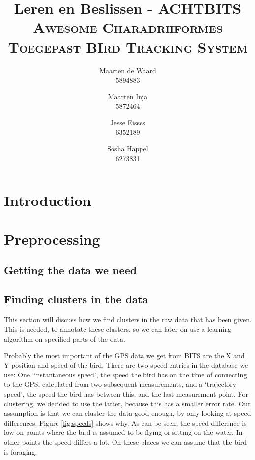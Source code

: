 \documentclass[a4paper,10pt]{article}
\title{Leren en Beslissen - ACHTBITS\\\large \textsc{Awesome Charadriiformes Toegepast
BIrd Tracking System}}
\author{Maarten de Waard\\5894883 \and Maarten Inja \\5872464 \and Jesse Eisses \\
6352189 \and Sosha Happel\\ 6273831}
\newcommand{\bits}{BITS\xspace}
\begin{document}
\maketitle
\section{Introduction}

\section{Preprocessing}
 \subsection{Getting the data we need}
 
 \subsection{Finding clusters in the data}
 This section will discuss how we find clusters in the raw data that has been
 given. This is needed, to annotate these clusters, so we can later on use a
 learning algorithm on specified parts of the data.

 Probably the most important of the GPS data we get from \bits are the X and Y
 position and speed of the bird. There are two speed entries in the database we
 use: One `instantaneous speed', the speed the bird has on the time of
 connecting to the GPS, calculated from two subsequent measurements, and a
 `trajectory speed', the speed the bird has between this, and the last
 measurement point. For clustering, we decided to use the latter, because this
 has a smaller error rate. Our assumption is that we can cluster the data good
 enough, by only looking at speed differences. Figure \ref{fig:speeds} shows
 why.
 As can be seen, the speed-difference is low on points where the bird is assumed
 to be flying or sitting on the water. In other points the speed differs a lot.
 On these places we can assume that the bird is foraging.
\end{document}
